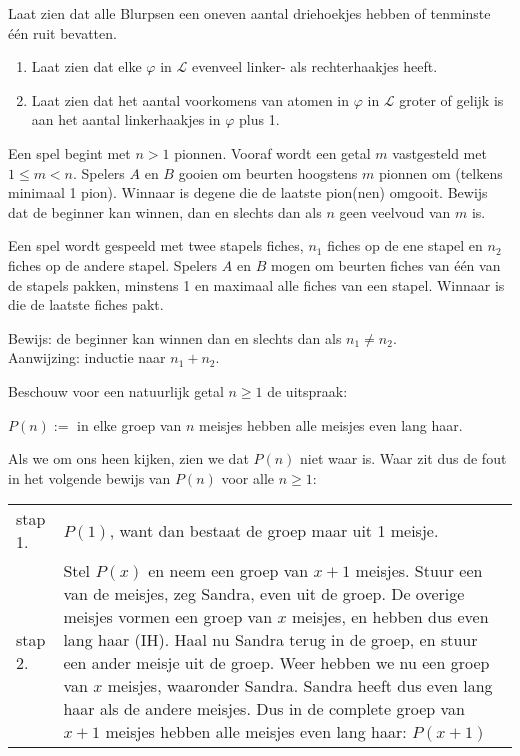 \begin{answer} %
Laat zien dat alle Blurpsen een oneven aantal driehoekjes hebben of tenminste \'e\'en ruit bevatten.
\end{answer}

\begin{answer}\mbox{}  %
\begin{enumerate}[label=\arabic*.]
    \item Laat zien dat elke $\varphi$ in $\mathcal{L}$ evenveel linker- als rechterhaakjes heeft.
    \item Laat zien dat het aantal voorkomens van atomen in $\varphi$ in $\mathcal{L}$ groter of gelijk is aan het aantal linkerhaakjes in $\varphi$ plus 1.
\end{enumerate}
\end{answer}

\begin{answer}[Optioneel] %
Een spel begint met $n>1$ pionnen. Vooraf wordt een getal $m$ vastgesteld met $1\leq m<n$. Spelers $A$ en $B$ gooien om beurten hoogstens $m$ pionnen om (telkens minimaal 1 pion). Winnaar is degene die de laatste pion(nen) omgooit. Bewijs dat de beginner kan winnen, dan en slechts dan als $n$ geen veelvoud van $m$ is.
\end{answer}

\begin{answer}[Optioneel] %
Een spel wordt gespeeld met twee stapels fiches, $n_1$ fiches op de ene stapel en $n_2$ fiches op de andere stapel. Spelers $A$ en $B$ mogen om beurten fiches van \'e\'en van de stapels pakken, minstens 1 en maximaal alle fiches van een stapel. Winnaar is die de laatste fiches pakt.

Bewijs: de beginner kan winnen dan en slechts dan als $n_1\not =n_2$.\\
Aanwijzing: inductie naar $n_1+n_2$.
\end{answer}

\begin{answer}[Optioneel] %
Beschouw voor een natuurlijk getal $n\geq 1$ de uitspraak:

\noindent $P(n):=$ in elke groep van $n$ meisjes hebben alle meisjes even lang haar.

Als we om ons heen kijken, zien we dat $P(n)$ niet waar is. Waar zit dus de fout in het volgende bewijs van $P(n)$ voor alle $n\geq 1$:

\noindent\begin{tabular}{lp{}}
stap 1. & $P(1)$, want dan bestaat de groep maar uit 1 meisje.\\
stap 2. & Stel $P(x)$ en neem een groep van $x+1$ meisjes. Stuur een van de meisjes, zeg Sandra, even uit de groep. De overige meisjes vormen een groep van $x$ meisjes, en hebben dus even lang haar (IH). Haal nu Sandra terug in de groep, en stuur een ander meisje uit de groep. Weer hebben we nu een groep van $x$ meisjes, waaronder Sandra. Sandra heeft dus even lang haar als de andere meisjes. Dus in de complete groep van $x+1$ meisjes hebben alle meisjes even lang haar: $P(x+1)$
\end{tabular}
\end{answer}

